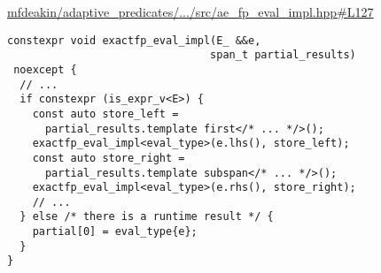 \href{https://github.com/mfdeakin/adaptive_predicates/blob/1caf304d6c502e619bcabdf51ab8696d52cff232/src/ae_fp_eval_impl.hpp#L127}{mfdeakin/adaptive\_predicates/.../src/ae\_fp\_eval\_impl.hpp\#L127}
\begin{lstlisting}[basicstyle=\small\ttfamily]
constexpr void exactfp_eval_impl(E_ &&e,
                                span_t partial_results)
 noexcept {
  // ...
  if constexpr (is_expr_v<E>) {
    const auto store_left =
      partial_results.template first</* ... */>();
    exactfp_eval_impl<eval_type>(e.lhs(), store_left);
    const auto store_right =
      partial_results.template subspan</* ... */>();
    exactfp_eval_impl<eval_type>(e.rhs(), store_right);
    // ...
  } else /* there is a runtime result */ {
    partial[0] = eval_type{e};
  }
}

\end{lstlisting}
